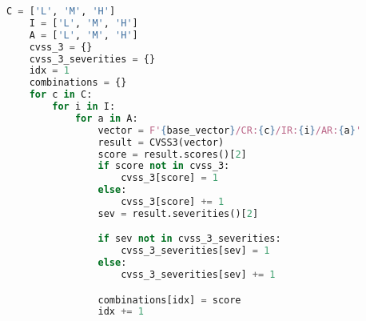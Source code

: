 \begin{lstlisting}[caption={Kod programu obliczający wszystkie możliwe kombinacje dla parametrów środowiskowych CVSS 3.x.}, label={lst:wplyw:cvss3}, language=Python, captionpos=b]
    C = ['L', 'M', 'H']
    I = ['L', 'M', 'H']
    A = ['L', 'M', 'H']
    cvss_3 = {}
    cvss_3_severities = {}
    idx = 1
    combinations = {}
    for c in C:
        for i in I:
            for a in A:
                vector = F'{base_vector}/CR:{c}/IR:{i}/AR:{a}'
                result = CVSS3(vector)
                score = result.scores()[2]
                if score not in cvss_3:
                    cvss_3[score] = 1
                else:
                    cvss_3[score] += 1
                sev = result.severities()[2]

                if sev not in cvss_3_severities:
                    cvss_3_severities[sev] = 1
                else:
                    cvss_3_severities[sev] += 1

                combinations[idx] = score
                idx += 1
\end{lstlisting}